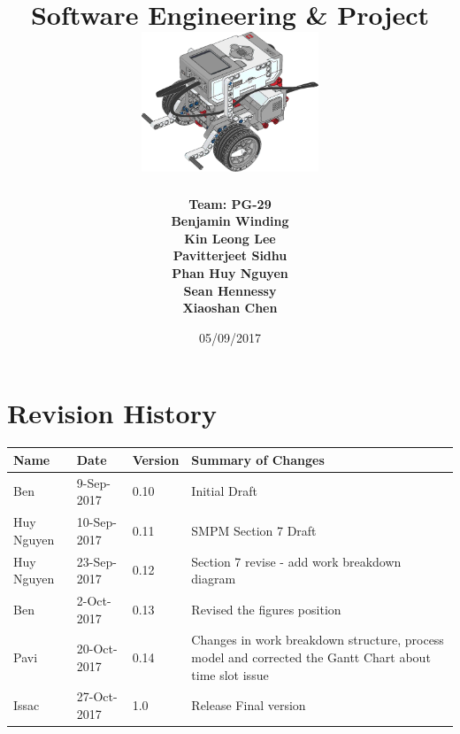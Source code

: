 \documentclass[10pt,a4paper,titlepage]{article}
\begin{document}
	
	\begin{titlepage}
		
		\title{
			\fontsize{50}{12}\\
			\vspace{20pt}
			\fontsize{20}{12}\\
			\vspace{10pt}
			\large{Software Engineering \& Project} \\
			\vspace{20pt}
			\includegraphics[width=200px]{title-page-ev3.png}					
		}
		\date{05/09/2017}
		\author{
			\bf{Team: PG-29} \\
			Benjamin Winding \\
			Kin Leong Lee \\
			Pavitterjeet Sidhu \\
			Phan Huy Nguyen \\
			Sean Hennessy \\
			Xiaoshan Chen \\
		}
		\maketitle
		
	\end{titlepage}
		 
	\tableofcontents	
	\listoffigures
	\listoftables
	
	
	\section*{Revision History}	
	\label{revtable}	
	\begin{tabular}{|p{2.1cm}|p{2.5cm}|p{2cm}|p{4.1cm}|}		
		\hline 
		\textbf {Name} & \textbf{Date} & \textbf {Version} &\textbf {Summary of Changes} \\ \hline
		Ben & 9-Sep-2017 & 0.10 & Initial Draft\\ 
		\hline Huy Nguyen & 10-Sep-2017 & 0.11 & SMPM Section 7 Draft\\ 
		\hline	Huy Nguyen & 23-Sep-2017 & 0.12 & Section 7 revise - add work breakdown diagram\\ 
	\hline	Ben & 2-Oct-2017 & 0.13 & Revised the figures position\\ 
	\hline
		Pavi & 20-Oct-2017 & 0.14 & Changes in work breakdown structure, process model and corrected the Gantt Chart about time slot issue \\ \hline
		Issac & 27-Oct-2017 & 1.0 & Release Final version \\ \hline
		
	\end{tabular}
\end{document}
